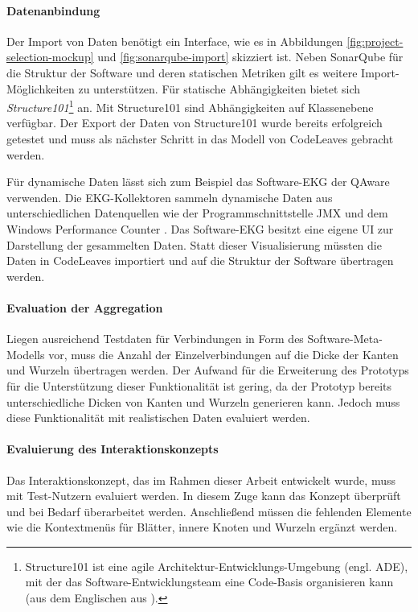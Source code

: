 \paragraph{Datenanbindung}

Der Import von Daten benötigt ein Interface, wie es in Abbildungen \ref{fig:project-selection-mockup} und \ref{fig:sonarqube-import} skizziert ist. Neben SonarQube für die Struktur der Software und deren statischen Metriken gilt es weitere Import-Möglichkeiten zu unterstützen. Für statische Abhängigkeiten bietet sich \textit{Structure101}\footnote{Structure101 ist eine agile Architektur-Entwicklungs-Umgebung (engl. ADE), mit der das Software-Entwicklungsteam eine Code-Basis organisieren kann (aus dem Englischen aus \cite{headway2017structure101}).} an. Mit Structure101 sind Abhängigkeiten auf Klassenebene verfügbar. Der Export der Daten von Structure101 wurde bereits erfolgreich getestet und muss als nächster Schritt in das Modell von CodeLeaves gebracht werden.

Für dynamische Daten lässt sich zum Beispiel das Software-EKG der QAware verwenden. Die EKG-Kollektoren sammeln dynamische Daten aus unterschiedlichen Datenquellen wie der Programmschnittstelle JMX und dem Windows Performance Counter \cite{weigend2011dynamische}. Das Software-EKG besitzt eine eigene UI zur Darstellung der gesammelten Daten. Statt dieser Visualisierung müssten die Daten in CodeLeaves importiert und auf die Struktur der Software übertragen werden.

\paragraph{Evaluation der Aggregation}

Liegen ausreichend Testdaten für Verbindungen in Form des Software-Meta-Modells vor, muss die Anzahl der Einzelverbindungen auf die Dicke der Kanten und Wurzeln übertragen werden. Der Aufwand für die Erweiterung des Prototyps für die Unterstützung dieser Funktionalität ist gering, da der Prototyp bereits unterschiedliche Dicken von Kanten und Wurzeln generieren kann. Jedoch muss diese Funktionalität mit realistischen Daten evaluiert werden.

\paragraph{Evaluierung des Interaktionskonzepts}

Das Interaktionskonzept, das im Rahmen dieser Arbeit entwickelt wurde, muss mit Test-Nutzern evaluiert werden. In diesem Zuge kann das Konzept überprüft und bei Bedarf überarbeitet werden. Anschließend müssen die fehlenden Elemente wie die Kontextmenüs für Blätter, innere Knoten und Wurzeln ergänzt werden.\\

